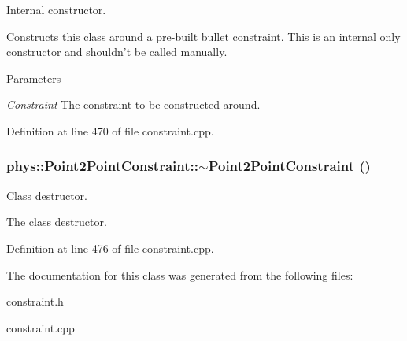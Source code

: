 Internal constructor. 

Constructs this class around a pre-\/built bullet constraint. This is an internal only constructor and shouldn't be called manually. 
\begin{DoxyParams}{Parameters}
\item[{\em Constraint}]The constraint to be constructed around. \end{DoxyParams}


Definition at line 470 of file constraint.cpp.

\hypertarget{classphys_1_1Point2PointConstraint_aa735ad83877ff57a8a49269a87a46253}{
\subsubsection[{$\sim$Point2PointConstraint}]{\setlength{\rightskip}{0pt plus 5cm}phys::Point2PointConstraint::$\sim$Point2PointConstraint ()}}
\label{da/dfb/classphys_1_1Point2PointConstraint_aa735ad83877ff57a8a49269a87a46253}


Class destructor. 

The class destructor. 

Definition at line 476 of file constraint.cpp.



The documentation for this class was generated from the following files:\begin{DoxyCompactItemize}
\item 
constraint.h\item 
constraint.cpp\end{DoxyCompactItemize}
